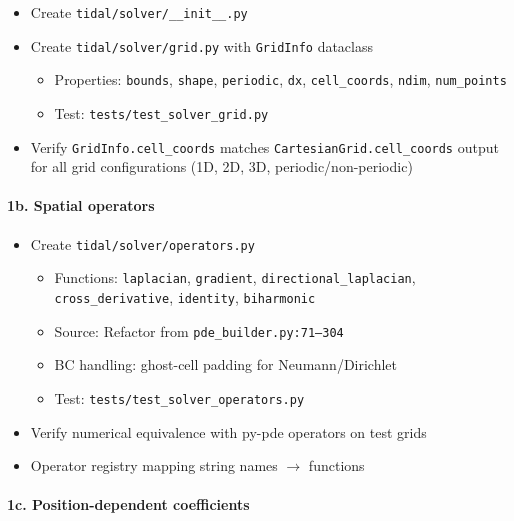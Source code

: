 \begin{itemize}
  \item[$\square$] Create \texttt{tidal/solver/\_\_init\_\_.py}
  \item[$\square$] Create \texttt{tidal/solver/grid.py} with \texttt{GridInfo} dataclass
  \begin{itemize}
    \item Properties: \texttt{bounds}, \texttt{shape}, \texttt{periodic}, \texttt{dx}, \texttt{cell\_coords}, \texttt{ndim}, \texttt{num\_points}
    \item Test: \texttt{tests/test\_solver\_grid.py}
  \end{itemize}
  \item[$\square$] Verify \texttt{GridInfo.cell\_coords} matches \texttt{CartesianGrid.cell\_coords} output
    for all grid configurations (1D, 2D, 3D, periodic/non-periodic)
\end{itemize}

\paragraph{1b. Spatial operators}
\label{par:operators}

\begin{itemize}
  \item[$\square$] Create \texttt{tidal/solver/operators.py}
  \begin{itemize}
    \item Functions: \texttt{laplacian}, \texttt{gradient}, \texttt{directional\_laplacian},
      \texttt{cross\_derivative}, \texttt{identity}, \texttt{biharmonic}
    \item Source: Refactor from \texttt{pde\_builder.py:71--304}
    \item BC handling: ghost-cell padding for Neumann/Dirichlet
    \item Test: \texttt{tests/test\_solver\_operators.py}
  \end{itemize}
  \item[$\square$] Verify numerical equivalence with py-pde operators on test grids
  \item[$\square$] Operator registry mapping string names $\to$ functions
\end{itemize}

\paragraph{1c. Position-dependent coefficients}
\label{par:pos-dep}

